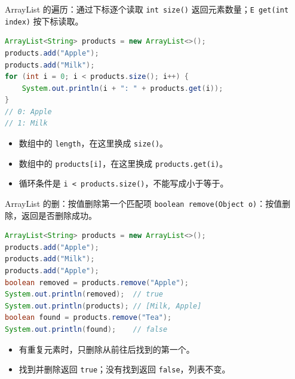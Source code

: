 \documentclass[aspectratio=169]{beamer}
\begin{document}
\begin{frame}[fragile]{ArrayList 的遍历：通过下标逐个读取}
  \texttt{int size()} 返回元素数量；\texttt{E get(int index)} 按下标读取。
  \begin{lstlisting}[language=Java]
ArrayList<String> products = new ArrayList<>();
products.add("Apple");
products.add("Milk");
for (int i = 0; i < products.size(); i++) {
    System.out.println(i + ": " + products.get(i));
}
// 0: Apple
// 1: Milk
  \end{lstlisting}
  \begin{itemize}
    \item 数组中的 \texttt{length}，在这里换成 \texttt{size()}。
    \item 数组中的 \texttt{products[i]}，在这里换成 \texttt{products.get(i)}。
    \item 循环条件是 \texttt{i < products.size()}，不能写成小于等于。
  \end{itemize}
\end{frame}

\begin{frame}[fragile]{ArrayList 的删：按值删除第一个匹配项}
  \texttt{boolean remove(Object o)}：按值删除，返回是否删除成功。
  \begin{lstlisting}[language=Java]
ArrayList<String> products = new ArrayList<>();
products.add("Apple");
products.add("Milk");
products.add("Apple");
boolean removed = products.remove("Apple");
System.out.println(removed);  // true
System.out.println(products); // [Milk, Apple]
boolean found = products.remove("Tea");
System.out.println(found);    // false
  \end{lstlisting}
  \begin{itemize}
    \item 有重复元素时，只删除从前往后找到的\alert{第一个}。
    \item 找到并删除返回 \texttt{true}；没有找到返回 \texttt{false}，列表不变。
  \end{itemize}
\end{frame}

\end{document}
